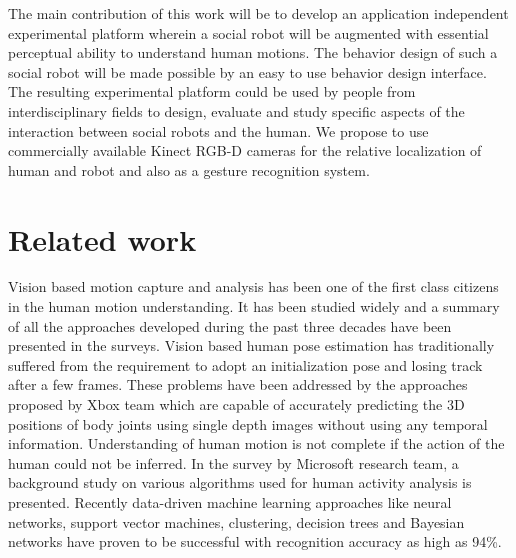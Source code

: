 \documentclass{llncs}
\begin{document}
The main contribution of this work will be to develop an application independent experimental platform wherein a social robot will be augmented with essential perceptual ability to understand human motions. The behavior design of such a social robot will be made possible by an easy to use behavior design interface. The resulting experimental platform could be used by people from interdisciplinary fields to design, evaluate and study specific aspects of the interaction between social robots and the human. We propose to use commercially available Kinect RGB-D cameras for the relative localization of human and robot and also as a gesture recognition system.
%
%
\section{Related work}
%
%
	Vision based motion capture and analysis has been one of the first class citizens in the human motion understanding. It has been studied widely and a summary of all the approaches developed during the past three decades have been presented in the surveys\cite{Moeslund200690}\cite{Poppe20074}. Vision based human pose estimation has traditionally suffered from the requirement to adopt an initialization pose and losing track after a few frames. These problems have been addressed by the approaches proposed by Xbox\cite{Kinect2014} team which are capable of accurately predicting the 3D positions of body joints using single depth images without using any temporal information\cite{Shotton2013}. Understanding of human motion is not complete if the action of the human could not be inferred. In the survey by Microsoft research team\cite{KinectCV2013}, a background study on various algorithms used for human activity analysis is presented. Recently data-driven machine learning approaches like neural networks, support vector machines, clustering, decision trees and Bayesian networks have proven to be successful with recognition accuracy as high as 94\%\cite{Kinect2014}.\\
	
\end{document}
